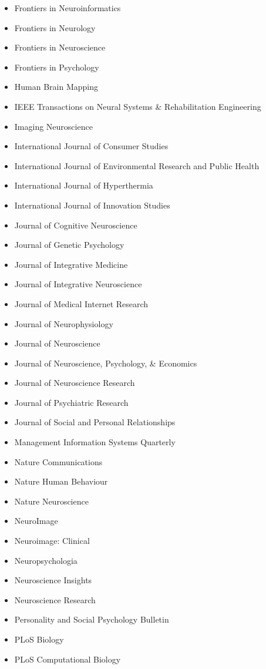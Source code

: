 \documentclass[11pt, letterpaper]{article}
\begin{document}
\begin{multicols}{2}
\begin{itemize}[noitemsep]
\item Frontiers in Neuroinformatics 
\item Frontiers in Neurology 
\item Frontiers in Neuroscience 
\item Frontiers in Psychology 
\item Human Brain Mapping 
\item IEEE Transactions on Neural Systems \& Rehabilitation Engineering
\item Imaging Neuroscience
\item International Journal of Consumer Studies
\item International Journal of Environmental Research and Public Health
\item International Journal of Hyperthermia 
\item International Journal of Innovation Studies
\item Journal of Cognitive Neuroscience 
\item Journal of Genetic Psychology
\item Journal of Integrative Medicine 
\item Journal of Integrative Neuroscience 
\item Journal of Medical Internet Research
\item Journal of Neurophysiology
\item Journal of Neuroscience 
\item Journal of Neuroscience, Psychology, \& Economics
\item Journal of Neuroscience Research
\item Journal of Psychiatric Research
\item Journal of Social and Personal Relationships
\item Management Information Systems Quarterly 
\item Nature Communications 
\item Nature Human Behaviour 
\item Nature Neuroscience
\item NeuroImage 
\item Neuroimage: Clinical 
\item Neuropsychologia 
\item Neuroscience Insights
\item Neuroscience Research 
\item Personality and Social Psychology Bulletin
\item PLoS Biology 
\item PLoS Computational Biology 

\end{itemize}
\end{multicols}
\end{document}
